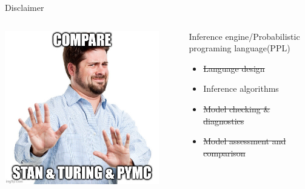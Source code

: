 \documentclass[bigger]{beamer}
\begin{document}
\begin{frame}[label={sec:orge88ba54}]{Disclaimer}
\begin{columns}
\begin{column}{0.33\columnwidth}
\begin{center}
\includegraphics[width=0.9\textwidth]{./figure/dont_want_3.jpg}
\end{center}
\end{column}

\begin{column}{0.33\columnwidth}
Inference engine/Probabilistic programing language(PPL)
\begin{itemize}
\item \sout{Language design}
\item Inference algorithms
\item \sout{Model checking \& diagnostics}
\item \sout{Model assessment and comparison}
\end{itemize}
\end{column}
\end{columns}
\end{frame}
\end{document}

